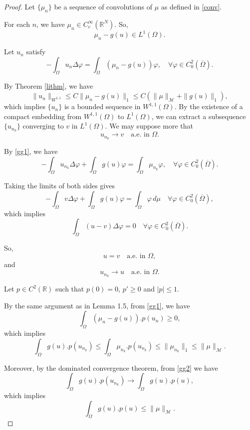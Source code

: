 \documentclass[a4paper, 11pt]{report}
\theoremstyle{definition}\newtheorem*{rmk}{Remark}
\begin{document}
\begin{proof}
\mbox{}

Let $\{\mu_n\}$ be a sequence of convolutions of $\mu$ as defined in \eqref{conv}.

For each $n$, we have $\mu_n \in C_c^{\infty}(\mathbb{R}^N)$. So,
\[
\mu_n - g(u) \in L^1(\Omega).
\]

Let $u_n$ satisfy
\begin{equation}\label{gg1}
-\int_{\Omega}u_n\Delta\varphi = \int_{\Omega}(\mu_n - g(u))\varphi,\quad \forall \varphi\in C^2_0(\overline{\Omega}).
\end{equation}

By Theorem \ref{lithm}, we have
\begin{equation}\label{gg4}
\| u_n\|_{W^{1,1}} \le C \| \mu_n - g(u)\|_1 \le C(\| \mu \|_{\mathcal{M}} + \| g(u) \|_1),
\end{equation}
which implies $\{ u_n\}$ is a bounded sequence in $W^{1,1}(\Omega)$. By the existence of a compact embedding from $W^{1,1}(\Omega)$ to $L^1(\Omega)$, we can extract a subsequence $\{ u_{n_k}\}$ converging to $v$ in $L^1(\Omega)$. We may suppose more that
\[
u_{n_k} \to v \quad \text{a.e.\ in }\Omega.
\]

By \eqref{gg1}, we have
\[
-\int_{\Omega}u_{n_k}\Delta\varphi + \int_{\Omega} g(u)\varphi = \int_{\Omega}\mu_{n_k}\varphi,\quad \forall \varphi\in C^2_0(\overline{\Omega}).
\]

Taking the limits of both sides gives
\[
-\int_{\Omega}v\Delta \varphi + \int_{\Omega} g(u)\varphi = \int_{\Omega}\varphi\, d \mu \quad\forall \varphi \in C^2_0(\overline{\Omega}),
\]
which implies
\[
\int_{\Omega}(u-v)\Delta \varphi = 0 \quad \forall \varphi \in C^2_0(\overline{\Omega}).
\]

So,
\[
u = v \quad\text{a.e.\ in } \Omega ,
\]
and
\begin{equation}\label{gg2}
u_{n_k} \to u \quad\text{a.e.\ in } \Omega.
\end{equation}

Let $p\in C^2(\mathbb{R})$ such that $p(0)=0$, $p' \ge 0$ and $|p|\le 1$.

By the same argument as in Lemma 1.5, from \eqref{gg1}, we have
\[
\int_{\Omega} (\mu_n - g(u)).p (u_n) \ge 0,
\]
which implies
\[
\int_{\Omega} g(u).p (u_{n_k}) \le \int_{\Omega}\mu_{n_k}.p (u_{n_k}) \le \| \mu_{n_k}\|_1 \le \| \mu \|_{\mathcal{M}}.
\]

Moreover, by the dominated convergence theorem, from \eqref{gg2} we have
\[
\int_{\Omega} g(u).p (u_{n_k}) \to \int_{\Omega} g(u).p (u),
\]
which implies
\begin{equation}\label{gg3}
\int_{\Omega} g(u).p (u) \le \| \mu \|_{\mathcal{M}}.
\end{equation}


\end{proof}
\end{document}

